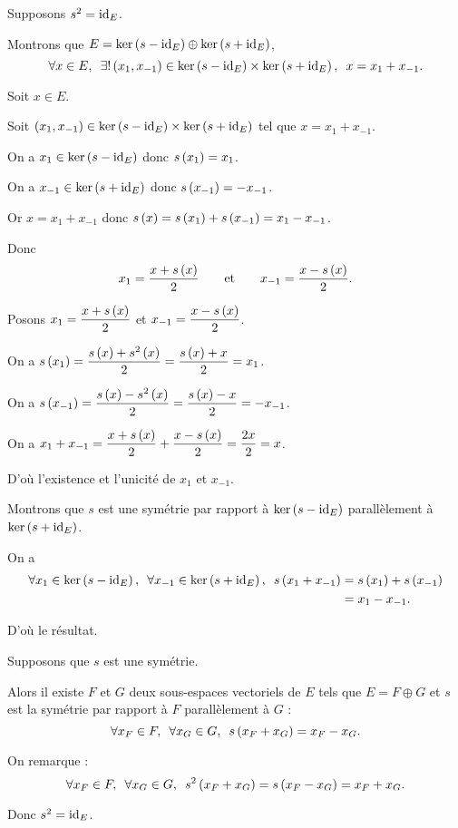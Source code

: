 \begin{dem}
\imprec

Supposons \(s^2=\mathrm{id}_{E}\).

Montrons que \(E=\ker\left(s-\mathrm{id}_{E}\right)\oplus\ker\left(s+\mathrm{id}_{E}\right)\), \cad \[\quantifs{\forall x\in E;\exists!\paren{x_1,x_{-1}}\in\ker\paren{s-\id{E}}\times\ker\paren{s+\id{E}}}x=x_1+x_{-1}.\]

Soit \(x\in E\).

\analyse

Soit \(\left(x_1,x_{-1}\right)\in\ker\left(s-\mathrm{id}_{E}\right)\times\ker\left(s+\mathrm{id}_{E}\right)\) tel que \(x=x_1+x_{-1}\).

On a \(x_1\in\ker\left(s-\mathrm{id}_{E}\right)\) donc \(s\left(x_1\right)=x_1\).

On a \(x_{-1}\in\ker\left(s+\mathrm{id}_{E}\right)\) donc \(s\left(x_{-1}\right)=-x_{-1}\).

Or \(x=x_1+x_{-1}\) donc \(s\left(x\right)=s\left(x_1\right)+s\left(x_{-1}\right)=x_1-x_{-1}\).

Donc \[x_1=\dfrac{x+s\left(x\right)}{2}\qquad\text{et}\qquad x_{-1}=\dfrac{x-s\left(x\right)}{2}.\]

\synthese

Posons \(x_1=\dfrac{x+s\left(x\right)}{2}\) et \(x_{-1}=\dfrac{x-s\left(x\right)}{2}\).

On a \(s\left(x_1\right)=\dfrac{s\left(x\right)+s^2\left(x\right)}{2}=\dfrac{s\left(x\right)+x}{2}=x_1\).

On a \(s\left(x_{-1}\right)=\dfrac{s\left(x\right)-s^2\left(x\right)}{2}=\dfrac{s\left(x\right)-x}{2}=-x_{-1}\).

On a \(x_1+x_{-1}=\dfrac{x+s\left(x\right)}{2}+\dfrac{x-s\left(x\right)}{2}=\dfrac{2x}{2}=x\).

\conclusion D'où l'existence et l'unicité de \(x_1\) et \(x_{-1}\).

Montrons que \(s\) est une symétrie par rapport à \(\ker\left(s-\mathrm{id}_{E}\right)\) parallèlement à \(\ker\left(s+\mathrm{id}_{E}\right)\).

On a \[\begin{aligned}
\quantifs{\forall x_1\in\ker\paren{s-\id{E}};\forall x_{-1}\in\ker\paren{s+\id{E}}}s\paren{x_1+x_{-1}}&=s\paren{x_1}+s\paren{x_{-1}} \\
&=x_1-x_{-1}.
\end{aligned}\]

D'où le résultat.

\impdir

Supposons que \(s\) est une symétrie.

Alors il existe \(F\) et \(G\) deux sous-espaces vectoriels de \(E\) tels que \(E=F\oplus G\) et \(s\) est la symétrie par rapport à \(F\) parallèlement à \(G\) : \[\quantifs{\forall x_F\in F;\forall x_G\in G}s\paren{x_F+x_G}=x_F-x_G.\]

On remarque : \[\quantifs{\forall x_F\in F;\forall x_G\in G}s^2\paren{x_F+x_G}=s\paren{x_F-x_G}=x_F+x_G.\]

Donc \(s^2=\mathrm{id}_{E}\).
\end{dem}

